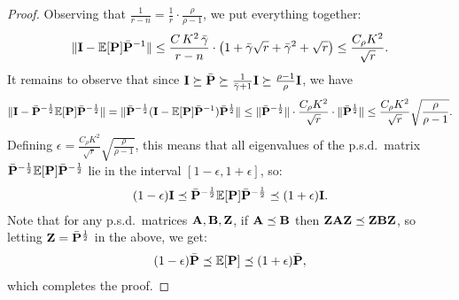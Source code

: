 \documentclass[11pt]{article}
\begin{document}
\begin{proof}
Observing that $\frac1{r-n} = \frac1r\cdot \frac{\rho}{\rho-1}$, we
put everything together:
\begin{align*}
  \|\mathbf I-\mathbb E[\mathbf P]\bar{\mathbf P}^{-1}\|\leq \frac{C\,K^2\,\bar\gamma}{r-n}\cdot
  \big(1 + \bar\gamma\sqrt{r} + \bar\gamma^2 + \sqrt r\big)
  \leq \frac{C_\rho K^2}{\sqrt r}.
\end{align*}
It remains to observe that since $\mathbf I\succeq\bar{\mathbf P}\succeq
\frac1{\bar\gamma+1}\mathbf I\succeq \frac{\rho-1}{\rho}\mathbf I$, we have
\begin{align*}
  \|\mathbf I-\bar{\mathbf P}^{-\frac12}\mathbb E[\mathbf P]\bar{\mathbf P}^{-\frac12}\| =
  \|\bar{\mathbf P}^{-\frac12}(\mathbf I-\mathbb E[\mathbf P]\bar{\mathbf P}^{-1})\bar{\mathbf P}^{\frac12}\|\leq
\|\bar{\mathbf P}^{-\frac12}\|\cdot\frac{C_\rho K^2}{\sqrt r}\cdot \|\bar{\mathbf P}^{\frac12}\|\leq
\frac{C_\rho K^2}{\sqrt r} \sqrt{\frac{\rho}{\rho-1}}.
\end{align*}
Defining $\epsilon =\frac{C_\rho K^2}{\sqrt r}
\sqrt{\frac{\rho}{\rho-1}}$, this means that all eigenvalues 
of the p.s.d.~matrix $\bar{\mathbf P}^{-\frac12}\mathbb E[\mathbf P]\bar{\mathbf P}^{-\frac12}$ lie
in the interval $[1-\epsilon,1+\epsilon]$, so:
\begin{align*}
  (1-\epsilon)\mathbf I\preceq
  \bar{\mathbf P}^{-\frac12}\mathbb E[\mathbf P]\bar{\mathbf P}^{-\frac12}\preceq (1+\epsilon)\mathbf I.
\end{align*}
Note that for any p.s.d.~matrices $\mathbf A,\mathbf B,\mathbf Z$, if $\mathbf A\preceq \mathbf B$ then
$\mathbf Z\mathbf A\mathbf Z\preceq \mathbf Z\mathbf B\mathbf Z$, so letting $\mathbf Z=\bar{\mathbf P}^{\frac12}$ in the above,
we get:
\begin{align*}
  (1-\epsilon)\bar{\mathbf P}\preceq
  \mathbb E[\mathbf P]\preceq (1+\epsilon)\bar{\mathbf P},
\end{align*}
which completes the proof.
\end{proof}
\end{document}
